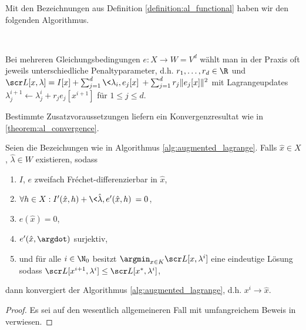 \documentclass{mythesis}
\begin{document}
\begin{algorithm} \label{alg:augmented_lagrange}
    Mit den Bezeichnungen aus Definition \ref{definition:al_functional} haben wir den folgenden Algorithmus.

    \begin{samepage}
	\\
	\begin{algorithmic}
	    \EndFor
	\end{algorithmic}
    \end{samepage}
    \begin{note}
	Bei mehreren Gleichungsbedingungen $e: X \to W = V^d$ wählt man in der Praxis oft jeweils unterschiedliche Penaltyparameter, d.h. $r_1, \dotsc, r_d \in \R$ und
	\begin{math}
	    \scr L[x, \lambda] = I[x] + \sum_{j=1}^d \<\lambda_i, e_j[x]\> + \sum_{j=1}^d r_j \|e_j[x]\|^2
	\end{math}
	mit Lagrangeupdates $\lambda^{i+1}_j \gets \lambda^i_j + r_j e_j[x^{i+1}]$ für $1 \le j \le d$.
    \end{note}
\end{algorithm}

Bestimmte Zusatzvoraussetzungen liefern ein Konvergenzresultat wie in \ref{theorem:al_convergence}.

\begin{theorem} \label{theorem:al_convergence}
    Seien die Bezeichungen wie in Algorithmus \ref{alg:augmented_lagrange}.
    Falls $\hat x \in X$, $\hat \lambda \in W$ existieren, sodass
    \begin{enumerate}[1)]
        \item
	    $I$, $e$ zweifach Fréchet-differenzierbar in $\hat x$,
	\item
	    $\forall h \in X: I'(\hat x,h) + \<\hat\lambda, e'(\hat x,h)\> = 0$,
	\item
	    $e(\hat x) = 0$,
	\item
	    $e'(\hat x, \argdot)$ surjektiv,
	\item
	    und für alle $i \in \N_0$ besitzt $\argmin_{x\in K} \scr L[x,\lambda^i]$ eine eindeutige Lösung sodass
	    $\scr L[x^{i+1}, \lambda^i] \le \scr L[x^*, \lambda^i]$,
    \end{enumerate}
    dann konvergiert der Algorithmus \ref{alg:augmented_lagrange}, d.h. $x^i \to \hat x$.
    \begin{proof}
        Es sei auf den wesentlich allgemeineren Fall mit umfangreichem Beweis in \cite[§3]{ito2008lagrange} verwiesen.
    \end{proof}
\end{theorem}
\end{document}
